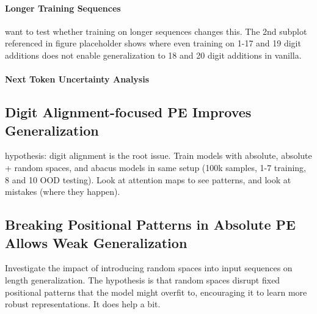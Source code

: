 \paragraph{Longer Training Sequences}
want to test whether training on longer sequences changes this. The 2nd subplot referenced in figure placeholder shows where even training on 1-17 and 19 digit additions does not enable generalization to 18 and 20 digit additions in vanilla.

\label{fig:baseline_and_longer}


\paragraph{Next Token Uncertainty Analysis}

\label{fig:next_token_entropy}

\subsection{Digit Alignment-focused PE Improves Generalization}
hypothesis: digit alignment is the root issue. Train models with absolute, absolute + random spaces, and abacus models in same setup (100k samples, 1-7 training, 8 and 10 OOD testing). Look at attention maps to see patterns, and look at mistakes (where they happen).

\label{fig:digit_align_pe}

\label{fig:digit_align_attn_maps}


\subsection{Breaking Positional Patterns in Absolute PE Allows Weak Generalization}
Investigate the impact of introducing random spaces into input sequences on length generalization. The hypothesis is that random spaces disrupt fixed positional patterns that the model might overfit to, encouraging it to learn more robust representations. It does help a bit.


